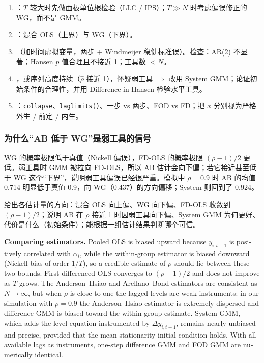 \begin{method}[动态面板估计的实务决策流程]
\begin{enumerate}
  \item {}：$T$ 较大时先做面板单位根检验（LLC / IPS）；$T\gg N$ 时考虑偏误修正的 WG，而不是 GMM。
  \item {}：混合 OLS（上界）与 WG（下界）。
  \item {}（加时间虚拟变量，两步 $+$ Windmeijer 稳健标准误）。检查：AR(2) 不显著；Hansen $p$ 值合理且不接近 1；工具数 $<N$。
  \item {}，或序列高度持续（$\hat\rho$ 接近 1），怀疑弱工具 $\Rightarrow$ 改用 System GMM；论证初始条件的合理性，并用 Difference-in-Hansen 检验水平工具。
  \item {}：\texttt{collapse}、\texttt{laglimits()}、一步 vs 两步、FOD vs FD；把 $x$ 分别视为严格外生 / 前定 / 内生。
\end{enumerate}
\end{method}

\subsubsection{为什么“AB 低于 WG”是弱工具的信号}

WG 的概率极限低于真值（Nickell 偏误），FD-OLS 的概率极限 $(\rho-1)/2$ 更低。弱工具时 GMM 被拉向 FD-OLS，所以 AB 估计会向下偏；若它接近甚至低于 WG 这个“下界”，说明弱工具偏误已经很严重。模拟中 $\rho=0.9$ 时 AB 的均值 0.714 明显低于真值 0.9，向 WG（0.437）的方向偏移；System 则回到了 0.924。

\begin{keypt}[估计量比较的常考点]
给出各估计量的方向：混合 OLS 向上偏、WG 向下偏、FD-OLS 收敛到 $(\rho-1)/2$；说明 AB 在 $\rho$ 接近 1 时因弱工具向下偏、System GMM 为何更好、代价是什么（初始条件）；能根据一组估计结果判断哪个可信。
\end{keypt}

\begin{english}
\textbf{Comparing estimators.} Pooled OLS is biased upward because $y_{i,t-1}$ is positively correlated with $\alpha_i$, while the within-group estimator is biased downward (Nickell bias of order $1/T$), so a credible estimate of $\rho$ should lie between these two bounds. First-differenced OLS converges to $(\rho-1)/2$ and does not improve as $T$ grows. The Anderson--Hsiao and Arellano--Bond estimators are consistent as $N\to\infty$, but when $\rho$ is close to one the lagged levels are weak instruments: in our simulation with $\rho=0.9$ the Anderson--Hsiao estimator is extremely dispersed and difference GMM is biased toward the within-group estimate. System GMM, which adds the level equation instrumented by $\Delta y_{i,t-1}$, remains nearly unbiased and precise, provided that the mean-stationarity initial condition holds. With all available lags as instruments, one-step difference GMM and FOD GMM are numerically identical.
\end{english}

